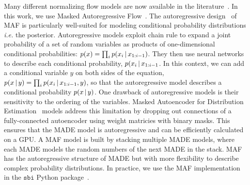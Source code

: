 Many different normalizing flow models are now available in the
literature~\citep[\emph{e.g.}][]{germain2015, durkan2019}.
In this work, we use Masked Autoregressive
Flow~\citep[MAF;][]{papamakarios2017}. 
The autoregressive design~\citep{uria2016} of MAF is particularly well-suited
for modeling conditional probability distributions \emph{i.e.} the posterior. 
Autoregressive models exploit chain rule to expand a joint probability of a set
of random variables as products of one-dimensional conditional
probabilities: $p(x) = \prod_i p(x_i\,|\, x_{1:i-1})$. 
They then use neural networks to describe each conditional probability,
$p(x_i\,|\, x_{1:i-1}$. 
In this context, we can add a conditional variable $y$ on both sides of the
equation, $p(x\,|\, y) = \prod_i p(x_i\,|\, x_{1:i-1}, y)$, so that the
autoregressive model describes a conditional probability $p(x\,|\, y)$. 
One drawback of autoregressive models is their sensitivity to the ordering of
the variables. 
Masked Autoencoder for Distribution Estimation~\citep[MADE;][]{germain2015}
models address this limitation by dropping out connections of a
fully-connected autoencoder using weight matricies with binary masks. 
This ensures that the MADE model is autoregressive and can be efficiently
calculated on a GPU. 
A MAF model is built by stacking multiple MADE models, where each MADE models
the random numbers of the next MADE in the stack. 
MAF has the autoregressive structure of MADE but with more flexibility to
describe complex probability distributions.  
In practice, we use the MAF implementation in the $\mathtt{sbi}$ Python
package~\citep{greenberg2019, tejero-cantero2020}.
